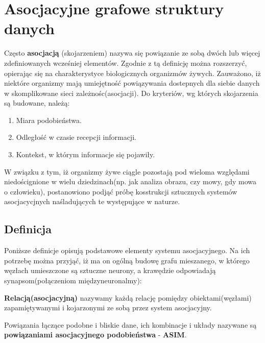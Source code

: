 
\section{Asocjacyjne grafowe struktury danych}
\label{sec:agds}
Często \textbf{asocjacją} (skojarzeniem) nazywa się powiązanie ze sobą dwóch lub więcej zdefiniowanych wcześniej elementów. Zgodnie z \cite[s. 47]{Horzyk} 
tą definicję można rozszerzyć, opierając się na charakterystyce biologicznych organizmów żywych. Zauważono, iż niektóre organizmy mają umiejętność
powiązywania dostepnych dla siebie danych w skomplikowane sieci zależnośc(asocjacji). Do kryteriów, wg których skojarzenia są budowane, należą:
\begin{enumerate}
    \item Miara podobieństwa. 
    \item Odległość w czasie recepcji informacji.
    \item Kontekst, w którym informacje się pojawiły.
\end{enumerate}
W związku z tym, iż organizmy żywe ciągle pozostają pod wieloma względami niedoścignione w wielu dziedzinach(np. jak analiza obrazu, czy mowy, gdy mowa o 
człowieku), postanowiono podjąć próbę kosstrukcji sztucznych systemów asocjacycjnych naśladujących te występujące w naturze.

\subsection{Definicja}
\label{subsec:assocDef}

Poniższe definicje \cite[s. 53-56]{Horzyk} opisują podstawowe elementy systemu asocjacyjnego. Na ich potrzebę można przyjąć, iż ma on ogólną budowę grafu mieszanego,
w którego węzłach umieszczone są sztuczne neurony, a krawędzie odpowiadają synapsom(połączeniom międzyneuronalmy):

\begin{definicja}
    \textbf{Relacją(asocjacyjną)} nazywamy każdą relację pomiędzy obiektami(węzłami) zapamiętywanymi i kojarzonymi ze sobą przez system asocjacyjny.
\end{definicja}

\begin{definicja}
    Powiązania łączące podobne i bliskie dane, ich kombinacje i układy nazywane są \textbf{powiązaniami asocjacyjnego podobieństwa} - \textbf{ASIM}.
\end{definicja}


